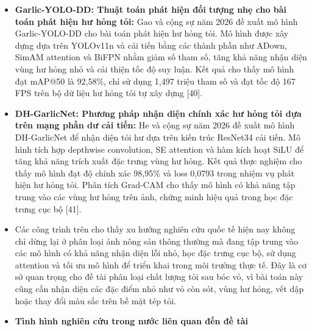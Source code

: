 \documentclass[
]{article}
\begin{document}
\begin{itemize}
  nhóm trạng thái bề mặt gồm clean, muddy. Mô hình multi-label đạt độ
  chính xác tổng thể 95,2\%; khi bổ sung lớp nền, độ chính xác tăng lên
  98,0\%; thời gian xử lý mỗi ảnh khoảng 0,021 giây. Công trình này
  chứng minh rằng CNN có thể được sử dụng hiệu quả trong xử lý ảnh hậu
  thu hoạch tỏi và có tiềm năng triển khai cho robot phân loại tỏi thời
  gian thực {[}28{]}.
\item
  \textbf{Garlic-YOLO-DD: Thuật toán phát hiện đối tượng nhẹ cho bài
  toán phát hiện hư hỏng tỏi:} Gao và cộng sự năm 2026 đề xuất mô hình
  Garlic-YOLO-DD cho bài toán phát hiện hư hỏng tỏi. Mô hình được xây
  dựng dựa trên YOLOv11n và cải tiến bằng các thành phần như ADown,
  SimAM attention và BiFPN nhằm giảm số tham số, tăng khả năng nhận diện
  vùng hư hỏng nhỏ và cải thiện tốc độ suy luận. Kết quả cho thấy mô
  hình đạt mAP@50 là 92,58\%, chỉ sử dụng 1,497 triệu tham số và đạt tốc
  độ 167 FPS trên bộ dữ liệu hư hỏng tỏi tự xây dựng {[}40{]}.
\item
  \textbf{DH-GarlicNet: Phương pháp nhận diện chính xác hư hỏng tỏi dựa
  trên mạng phần dư cải tiến:} He và cộng sự năm 2026 đề xuất mô hình
  DH-GarlicNet để nhận diện tỏi hư dựa trên kiến trúc ResNet34 cải tiến.
  Mô hình tích hợp depthwise convolution, SE attention và hàm kích hoạt
  SiLU để tăng khả năng trích xuất đặc trưng vùng hư hỏng. Kết quả thực
  nghiệm cho thấy mô hình đạt độ chính xác 98,95\% và loss 0,0793 trong
  nhiệm vụ phát hiện hư hỏng tỏi. Phân tích Grad-CAM cho thấy mô hình có
  khả năng tập trung vào các vùng hư hỏng trên ảnh, chứng minh hiệu quả
  trong học đặc trưng cục bộ {[}41{]}.
\end{itemize}

\begin{itemize}
\item
  Các công trình trên cho thấy xu hướng nghiên cứu quốc tế hiện nay
  không chỉ dừng lại ở phân loại ảnh nông sản thông thường mà đang tập
  trung vào các mô hình có khả năng nhận diện lỗi nhỏ, học đặc trưng cục
  bộ, sử dụng attention và tối ưu mô hình để triển khai trong môi trường
  thực tế. Đây là cơ sở quan trọng cho đề tài phân loại chất lượng tỏi
  sau bóc vỏ, vì bài toán này cũng cần nhận diện các đặc điểm nhỏ như vỏ
  còn sót, vùng hư hỏng, vết dập hoặc thay đổi màu sắc trên bề mặt tép
  tỏi.
\end{itemize}

\begin{itemize}
\item
  \textbf{Tình hình nghiên cứu trong nước liên quan đến đề tài}
\end{itemize}
\end{document}

